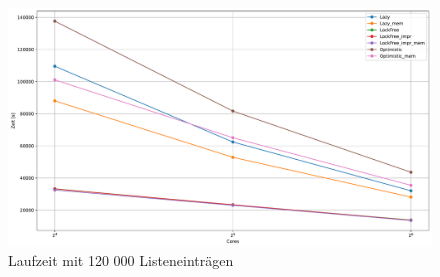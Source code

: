 \begin{figure}[H]
	\centering
	\includegraphics[width=1.0\linewidth]{./plots_pdf/mixed_time_cores_120000.pdf} 
	\caption{Laufzeit mit 120 000 Listeneinträgen}
	\label{fig:mixed_time_cores_120000} 
\end{figure}